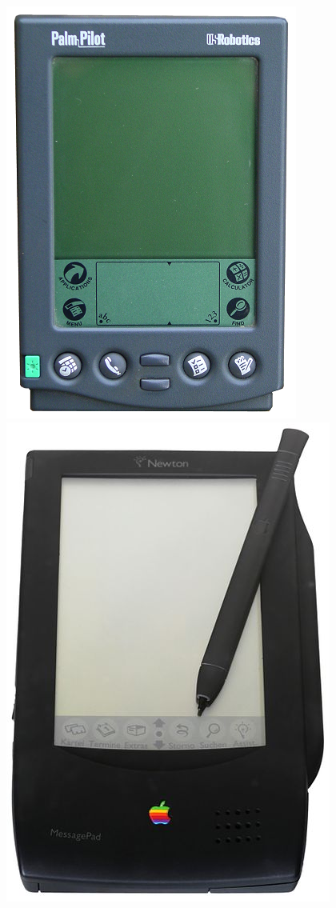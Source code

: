 \documentclass[letterpaper,12pt]{article}
\begin{document}
\begin{center}
\includegraphics[scale=0.3]{images/Palmpilot5000}
\includegraphics[scale=0.3]{images/Apple_Newton}
\end{center}
\end{document}
